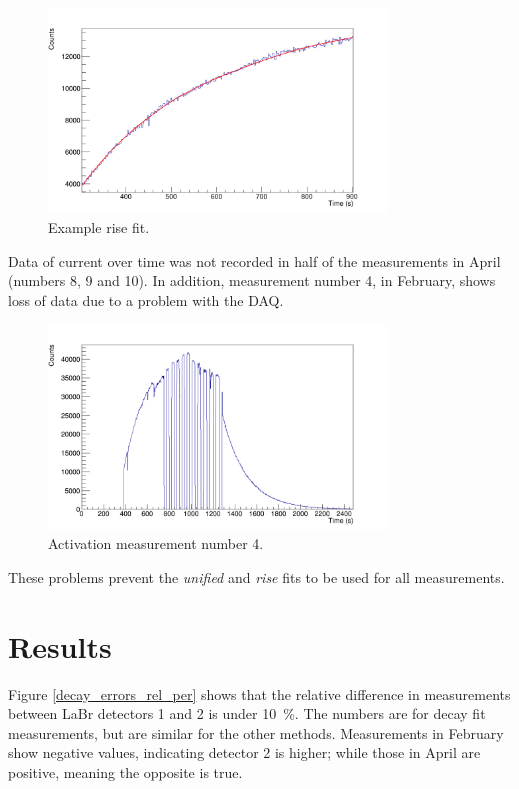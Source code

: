 \documentclass[a4paper,12pt]{report}
\begin{document}
\begin{figure}[H]
	\centering
	\includegraphics[width=0.80\textwidth]{example_rise_fit.png}
	\caption{Example rise fit.}
	\label{example_rise_fit}
\end{figure}

Data of current over time was not recorded in half of the measurements in April (numbers 8, 9 and 10).	%
In addition, measurement number 4, in February, shows loss of data due to a problem with the DAQ.

\begin{figure}[H]
	\centering
	\includegraphics[width=0.80\textwidth]{activation_4_time.png}
	\caption{Activation measurement number 4.}
	\label{activation_4_time}
\end{figure}

These problems prevent the \textit{unified} and \textit{rise} fits to be used for all measurements.
\\

\section{Results}
Figure \ref{decay_errors_rel_per} shows that the relative difference in measurements between LaBr detectors 1 and 2 is under \qty{10}{\percent}.
The numbers are for decay fit measurements, but are similar for the other methods.
Measurements in February show negative values, indicating detector 2 is higher; while those in April are positive, meaning the opposite is true.
\end{document}
